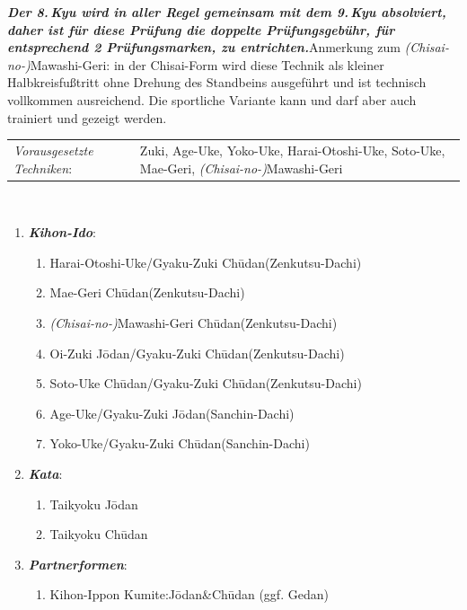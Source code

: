 	\renewcommand{\labelenumi}{\alph{enumi}.)}
	\renewcommand{\labelenumii}{\arabic*.}
{\scriptsize\textbf{\textit{Der 8.\,Kyu wird in aller Regel gemeinsam mit dem 9.\,Kyu absolviert, daher ist für diese Prüfung die doppelte Prüfungsgebühr, für entsprechend 2 Prüfungsmarken, zu entrichten.}}\newline Anmerkung zum \textit{(Chisai-no-)}Mawashi-Geri: in der Chisai-Form wird diese Technik als kleiner Halbkreisfußtritt ohne Drehung des Standbeins ausgeführt und ist technisch vollkommen ausreichend. Die sportliche Variante kann und darf aber auch trainiert und gezeigt werden.\newline
 	\begin{tabularx}{\textwidth}{lX}
		\textit{Vorausgesetzte Techniken}:& Zuki, Age-Uke, Yoko-Uke, Harai-Otoshi-Uke, Soto-Uke, Mae-Geri, \textit{(Chisai-no-)}Mawashi-Geri
	\end{tabularx}\\}
	\begin{enumerate}[nosep]
		\item \textit{\textbf{Kihon-Ido}}:
		\begin{enumerate}[nosep]
			\item Harai-Otoshi-Uke/Gyaku-Zuki Ch\={u}dan\tabto{280pt}(Zenkutsu-Dachi)
			\item Mae-Geri Ch\={u}dan\tabto{280pt}(Zenkutsu-Dachi)
			\item \textit{(Chisai-no-)}Mawashi-Geri Ch\={u}dan\tabto{280pt}(Zenkutsu-Dachi)
			\item Oi-Zuki J\={o}dan/Gyaku-Zuki Ch\={u}dan\tabto{280pt}(Zenkutsu-Dachi)
			\item Soto-Uke Ch\={u}dan/Gyaku-Zuki Ch\={u}dan\tabto{280pt}(Zenkutsu-Dachi)
			\item Age-Uke/Gyaku-Zuki J\={o}dan\tabto{280pt}(Sanchin-Dachi)
			\item Yoko-Uke/Gyaku-Zuki Ch\={u}dan\tabto{280pt}(Sanchin-Dachi)
		\end{enumerate}
		\item \textit{\textbf{Kata}}:
			\begin{enumerate}[nosep]
			\item Taikyoku J\={o}dan
			\item Taikyoku Ch\={u}dan
			\end{enumerate}
		\item \textit{\textbf{Partnerformen}}:
		\begin{enumerate}[nosep]
			\item Kihon-Ippon Kumite:\tabto{280pt}J\={o}dan\&Ch\={u}dan (ggf. Gedan)
		\end{enumerate}
	\end{enumerate}